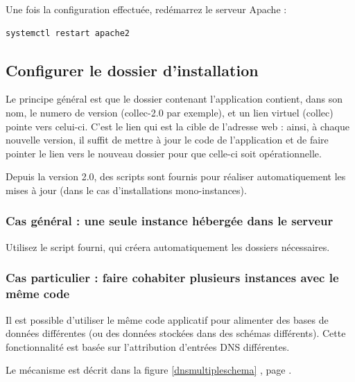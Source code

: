 Une fois la configuration effectuée, redémarrez le serveur Apache :
\begin{lstlisting}
systemctl restart apache2
\end{lstlisting}

\subsection{Configurer le dossier d'installation}

Le principe général est que le dossier contenant l'application contient, dans son nom, le numero de version (collec-2.0 par exemple), et un lien virtuel (collec) pointe vers celui-ci. C'est le lien qui est la cible de l'adresse web : ainsi, à chaque nouvelle version, il suffit de mettre à jour le code de l'application et de faire pointer le lien vers le nouveau dossier pour que celle-ci soit opérationnelle.

Depuis la version 2.0, des scripts sont fournis pour réaliser automatiquement les mises à jour (dans le cas d'installations mono-instances).

\subsubsection{Cas général : une seule instance hébergée dans le serveur}

Utilisez le script fourni, qui créera automatiquement les dossiers nécessaires. 


\subsubsection{Cas particulier : faire cohabiter plusieurs instances avec le même code}
\label{dnsmultiple}
Il est possible d'utiliser le même code applicatif pour alimenter des bases de données différentes (ou des données stockées dans des schémas différents). Cette fonctionnalité est basée sur l'attribution d'entrées DNS différentes. 

Le mécanisme est décrit dans la figure \ref{dnsmultipleschema} \textit{}, page \pageref{dnsmultipleschema}.

